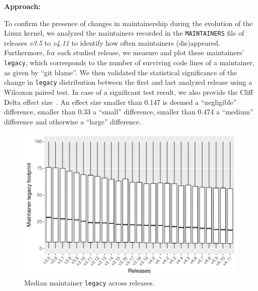 {\bf Approach:}

To confirm the presence of changes in maintainership during the evolution of the Linux kernel, we analyzed the maintainers recorded in the \texttt{MAINTAINERS} file of releases \textit{v3.5} to \textit{v4.11} to identify how often maintainers (dis)appeared. %
Furthermore, for each studied release, we measure and plot these maintainers' \texttt{legacy}, which corresponds to the number of surviving code lines of a maintainer, as given by ``git blame''. %
We then validated the statistical significance of the change in \texttt{legacy} distribution between the first and last analyzed release using a Wilcoxon paired test. %
In case of a significant test result, we also provide the Cliff Delta effect size~\cite{Romano:2006}. An effect size smaller than 0.147 is deemed a ``negligible'' difference, smaller than 0.33 a ``small'' difference, smaller than 0.474 a ``medium'' difference and otherwise a ``large'' difference.


\begin{figure}[t]
  \centering
  \includegraphics[scale=.6]{plots/RQ1_median_LOC}
  \caption{Median maintainer \texttt{legacy} across releases.}
  \label{fig:RQ1_temp}
\end{figure}

